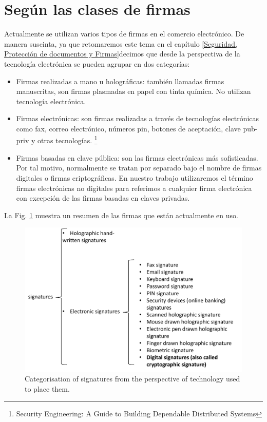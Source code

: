 \documentclass[12pt]{report} %
\begin{document}
 



\section{Según las clases de firmas}

Actualmente se utilizan varios tipos de firmas en el comercio electrónico. De manera suscinta, ya que retomaremos este tema en el capítulo \ref{Seguridad, Protección de documentos y Firmas}decimos que desde la perspectiva de la tecnología electrónica se pueden agrupar en dos categorías:

\begin{itemize}
    \item Firmas realizadas a mano u holográficas: también llamadas firmas manuscritas, son firmas plasmadas en papel con tinta química. No utilizan tecnología electrónica.
    
    \item Firmas electrónicas: son firmas realizadas a través de tecnologías electrónicas como fax, correo electrónico, números pin, botones de aceptación, clave pub-priv y otras tecnologías. \footnote{\cite{Andersson2020}Security Engineering: A Guide to Building Dependable Distributed Systems}

    \item Firmas basadas en clave pública: son las firmas electrónicas más sofisticadas. Por tal motivo, normalmente se tratan por separado bajo el nombre de firmas digitales o firmas criptográficas. En nuestro trabajo utilizaremos el término firmas electrónicas no digitales para referimos a cualquier firma electrónica con excepción de las firmas basadas en claves privadas.

    \end{itemize}

   La Fig. \ref{fig:signaturecategories} muestra un resumen de las firmas que están actualmente en uso.

\begin{figure}
\centering
\includegraphics[width=0.85\columnwidth]{figures/signaturecategories.pdf}
\caption{Categorisation of signatures from the perspective of technology used to place them.}
\label{fig:signaturecategories}
\end{figure}
\end{document}
